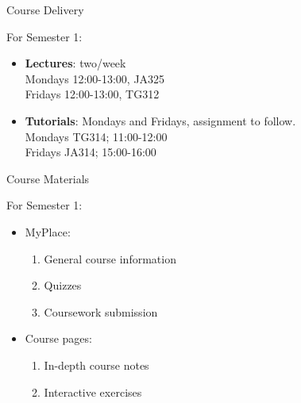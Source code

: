 \documentclass[xetex,aspectratio=169,14pt,hyperref={pdfpagelabels=true,pdflang={en-GB}}]{beamer}
\begin{document}

\begin{frame}
  {Course Delivery}

  For Semester 1:
  \begin{itemize}
  \item \textbf{Lectures}: two/week \\
    \quad Mondays 12:00-13:00, JA325 \\
    \quad Fridays 12:00-13:00, TG312

    \medskip

  \item \textbf{Tutorials}: Mondays and Fridays, assignment to follow. \\
    \quad Mondays TG314; 11:00-12:00 \\
    \quad Fridays JA314; 15:00-16:00
  \end{itemize}
\end{frame}

\begin{frame}
  {Course Materials}

  For Semester 1:
  \begin{itemize}
  \item MyPlace:
    \begin{enumerate}
    \item General course information
    \item Quizzes
    \item Coursework submission
    \end{enumerate}
  \item Course pages: \\
    \begin{enumerate}
    \item In-depth course notes
    \item Interactive exercises
    \end{enumerate}
  \end{itemize}
\end{frame}
\end{document}
